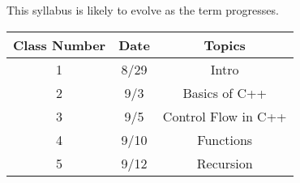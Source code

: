 \documentclass[a4paper]{article}
\begin{document}
This syllabus is likely to evolve as the term progresses.
\begin{center}
    \begin{tabular}{||c c c ||} 
     \hline
     Class Number & Date & Topics  \\ [0.5ex] 
     \hline\hline
     1 & 8/29 & Intro  \\ 
     \hline
     2 & 9/3 & Basics of C++  \\
     \hline
     3 & 9/5 & Control Flow in C++  \\
     \hline
     4 & 9/10 & Functions  \\
     \hline
     5 & 9/12 & Recursion  \\ [1ex] 
     \hline
    \end{tabular}
    \end{center}
\end{document}
